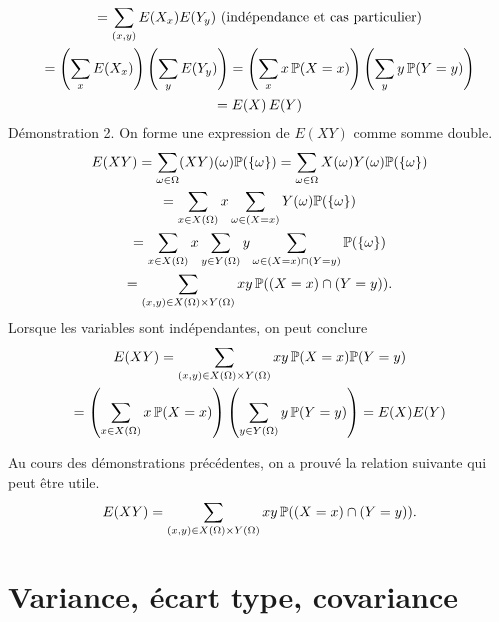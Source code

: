 \begin{demo}
\begin{multline*}
= \sum_{(x,y)}E(X_x) E(Y_y)\text{ (indépendance et cas particulier)}\\
= \left(\sum_{x}E(X_x) \right) \left(\sum_{y} E(Y_y) \right)
= \left(\sum_{x}x\,\mathbb{P}(X=x) \right) \left(\sum_{y} y\,\mathbb{P}(Y=y) \right)\\
= E(X)\, E(Y)
\end{multline*}
\newpage
Démonstration 2.\newline
On forme une expression de $E(XY)$ comme somme double.
\begin{multline*}
  E(XY) = \sum_{\omega \in \Omega} (XY)(\omega)\mathbb{P}(\left\lbrace\omega\right\rbrace)
= \sum_{\omega \in \Omega} X(\omega)Y(\omega)\mathbb{P}(\left\lbrace\omega\right\rbrace)\\
= \sum_{x\in X(\Omega)}x\sum_{\omega \in (X=x)}Y(\omega)\mathbb{P}(\left\lbrace\omega\right\rbrace) \\
= \sum_{x\in X(\Omega)}x\sum_{y\in Y(\Omega)}y \sum_{\omega \in (X=x)\cap(Y=y)}\mathbb{P}(\left\lbrace\omega\right\rbrace)\\
= \sum_{(x,y)\in X(\Omega)\times Y(\Omega)}xy\, \mathbb{P}((X=x)\cap(Y=y)).
\end{multline*}
Lorsque les variables sont indépendantes, on peut conclure
\begin{multline*}
  E(XY) = \sum_{(x,y)\in X(\Omega)\times Y(\Omega)}xy\, \mathbb{P}(X=x)\mathbb{P}(Y=y)\\
  = \left( \sum_{x\in X(\Omega)}x\,\mathbb{P}(X=x)\right) \left( \sum_{y\in Y(\Omega)}y\,\mathbb{P}(Y=y)\right)
  = E(X)E(Y)
\end{multline*}
\end{demo}
Au cours des démonstrations précédentes, on a prouvé la relation suivante qui peut être utile.
\[
 E(XY) = \sum_{(x,y)\in X(\Omega)\times Y(\Omega)}xy\, \mathbb{P}((X=x)\cap(Y=y)).
\]
\newpage
\section{Variance, écart type, covariance}
